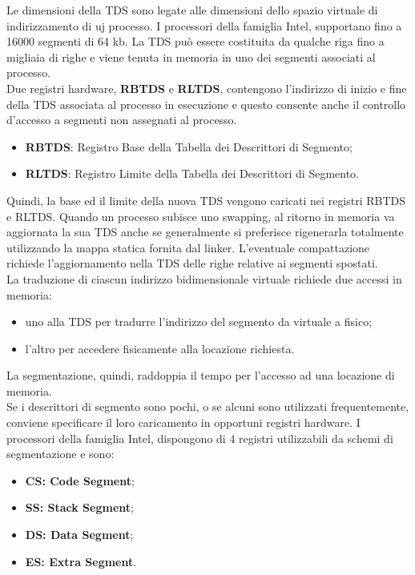 \documentclass[12pt, letterpaper]{report}
\begin{document}
	Le dimensioni della TDS sono legate alle dimensioni dello spazio virtuale di indirizzamento di uj processo. I processori della famiglia Intel, supportano fino a 16000 segmenti di 64 kb. La TDS può essere costituita da qualche riga fino a migliaia di righe e viene tenuta in memoria in uno dei segmenti associati al processo. \\
	Due registri hardware, \textbf{RBTDS} e \textbf{RLTDS}, contengono l'indirizzo di inizio e fine della TDS associata al processo in esecuzione e questo consente anche il controllo d'accesso a segmenti non assegnati al processo.
	\begin{itemize}
		\item \textbf{RBTDS}: Registro Base della Tabella dei Descrittori di Segmento;
		\item \textbf{RLTDS}: Registro Limite della Tabella dei Descrittori di Segmento.
	\end{itemize}
	Quindi, la base ed il limite della nuova TDS vengono caricati nei registri RBTDS e RLTDS. Quando un processo subisce uno swapping, al ritorno in memoria va aggiornata la sua TDS anche se generalmente si preferisce rigenerarla totalmente utilizzando la mappa statica fornita dal linker. L'eventuale compattazione richiede l'aggiornamento nella TDS delle righe relative ai segmenti spostati. \\
	La traduzione di ciascun indirizzo bidimensionale virtuale richiede due accessi in memoria:
	\begin{itemize}
		\item uno alla TDS per tradurre l'indirizzo del segmento da virtuale a fisico;
		\item l'altro per accedere fisicamente alla locazione richiesta.
	\end{itemize}
	La segmentazione, quindi, raddoppia il tempo per l'accesso ad una locazione di memoria. \\
	Se i descrittori di segmento sono pochi, o se alcuni sono utilizzati frequentemente, conviene specificare il loro caricamento in opportuni registri hardware. I processori della famiglia Intel, dispongono di 4 registri utilizzabili da schemi di segmentazione e sono:
	\begin{itemize}
		\item \textbf{CS: Code Segment};
		\item \textbf{SS: Stack Segment};
		\item \textbf{DS: Data Segment};
		\item \textbf{ES: Extra Segment}.
	\end{itemize}
\end{document}
